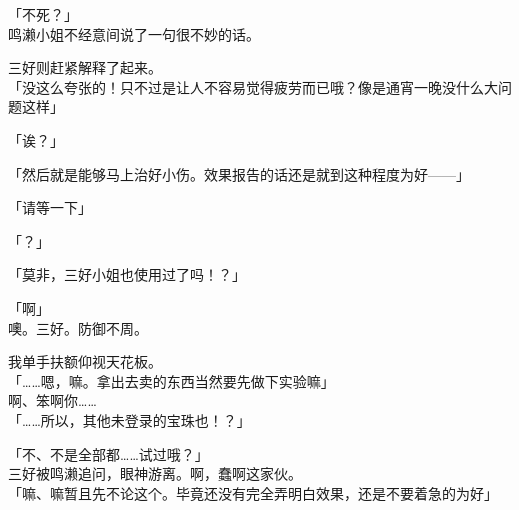 「不死？」\\

鸣濑小姐不经意间说了一句很不妙的话。

三好则赶紧解释了起来。\\

「没这么夸张的！只不过是让人不容易觉得疲劳而已哦？像是通宵一晚没什么大问题这样」

「诶？」

「然后就是能够马上治好小伤。效果报告的话还是就到这种程度为好——」

「请等一下」

「？」

「莫非，三好小姐也使用过了吗！？」

「啊」\\

噢。三好。防御不周。

我单手扶额仰视天花板。\\

「……嗯，嘛。拿出去卖的东西当然要先做下实验嘛」\\

啊、笨啊你……\\

「……所以，其他未登录的宝珠也！？」

「不、不是全部都……试过哦？」\\

三好被鸣濑追问，眼神游离。啊，蠢啊这家伙。\\

「嘛、嘛暂且先不论这个。毕竟还没有完全弄明白效果，还是不要着急的为好」\\

